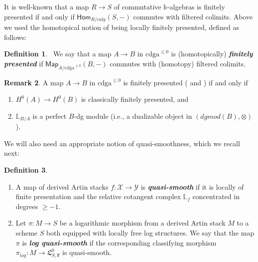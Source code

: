 \documentclass[11pt]{amsart}
\newcommand {\Hom} {\mathsf{Hom}}
\newcommand {\map} {\mathsf{Map}}
\newcommand  {\cdga}     {\mathrm{cdga}}
\theoremstyle{plain}
\numberwithin{equation}{section}
\theoremstyle{definition}
\newtheorem{Def}{Definition}[section]
\newtheorem{Rem}[Def]{Remark}
\theoremstyle{plain}
\begin{document}
\smallskip


\noindent
It is well-known that a map $R \longrightarrow S$ of commutative $\mathbb{k}$-algebras is finitely presented if and only if $\Hom_{R/calg}(S,-)$ commutes with filtered colimits. 
Above we used the homotopical notion of being locally finitely presented, defined as follows:


\smallskip

\begin{Def} \cite[Definition 2.16]{PV} \ We say that a map $A\longrightarrow B$ in $\cdga^{\leq 0}$ is (homotopically) \emph{\bfseries finitely presented} if $\map_{A/\cdga^{\leq 0}}(B, -) $ commutes with (homotopy) filtered colimits.
\end{Def}



\begin{Rem} \label{Rem0910}
A map $A \longrightarrow B$ in $\cdga^{\leq 0}$ is finitely presented (\cite[Definition 2.16]{PV} and \cite[Theorem 7.4.3.18]{20}) if and only if
\begin{enumerate}
\item $H^0(A)\longrightarrow H^0(B)$ is classically finitely presented, and
\item $\mathbb L_{B/A}$ is a perfect $B$-dg module (i.e., a dualizable object in $(dgmod(B), \otimes)$). 
\end{enumerate}
\end{Rem}

\smallskip

\noindent
We will also need an appropriate notion of quasi-smoothness, which we recall next:

\smallskip

\begin{Def} 
\begin{enumerate}[label=\upshape(\alph*),ref=\thesubsubsection (\alph*)]
\item\label{qs} A map of derived Artin stacks $f: \mathcal X\longrightarrow \mathcal Y$ is \emph{\bfseries quasi-smooth}  if it is locally of finite presentation and the relative cotangent complex $\mathbb L_f$ concentrated in degrees $\geq -1$.
\item\label{LQS}
Let $\pi: M\rightarrow S$ be a logarithmic morphism from a derived Artin stack $M$ to a scheme $S$ both equipped with locally free log structures. We say that the map $\pi$ is \emph{\bfseries log quasi-smooth} if the corresponding classifying  morphism $\pi_{log} : M \to \mathfrak{L}^{0}_{S,\mathsf{lf}}$ is quasi-smooth.
\end{enumerate}
\end{Def}
\end{document}
